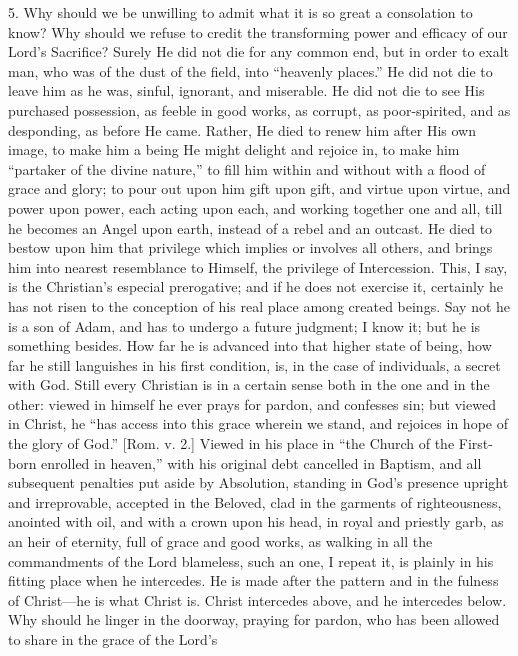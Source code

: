 5. Why should we be unwilling to admit what it is so great a
consolation to know? Why should we refuse to credit the transforming
power and efficacy of our Lord's Sacrifice? Surely He did not die
for any common end, but in order to exalt man, who was of the dust of
the field, into ``heavenly places.'' He did not die to leave
him as he was, sinful, ignorant, and miserable. He did not die to see
His purchased possession, as feeble in good works, as corrupt, as
poor-spirited, and as desponding, as before He came. Rather, He died
to renew him after His own image, to make him a being He might delight
and rejoice in, to make him ``partaker of the divine nature,''
to fill him within and without with a flood of grace and glory; to
pour out upon him gift upon gift, and virtue upon virtue, and power
upon power, each acting upon each, and working together one and all,
till he becomes an Angel upon earth, instead of a rebel and an
outcast. He died to bestow upon him that privilege which implies or
involves all others, and brings him into nearest resemblance to
Himself, the privilege of Intercession. This, I say, is the Christian's
especial prerogative; and if he does not exercise it, certainly he has
not risen to the conception of his real place among created beings.
Say not he is a son of Adam, and has to undergo a future judgment; I
know it; but he is something besides. How far he is advanced into that
higher state of being, how far he still languishes in his first
condition, is, in the case of individuals, a secret with God. Still
every Christian is in a certain sense both in the one and in the
other: viewed in himself he ever prays for pardon, and confesses sin;
but viewed in Christ, he ``has access into this grace wherein we
stand, and rejoices in hope of the glory of God.'' [Rom. v. 2.]
Viewed in his place in ``the Church of the First-born enrolled in
heaven,'' with his original debt cancelled in Baptism, and all
subsequent penalties put aside by Absolution, standing in God's presence upright and irreprovable, accepted in the Beloved, clad in
the garments of righteousness, anointed with oil, and with a crown
upon his head, in royal and priestly garb, as an heir of eternity,
full of grace and good works, as walking in all the commandments of
the Lord blameless, such an one, I repeat it, is plainly in his
fitting place when he intercedes. He is made after the pattern and in
the fulness of Christ—he is what Christ is. Christ intercedes above,
and he intercedes below. Why should he linger in the doorway, praying
for pardon, who has been allowed to share in the grace of the Lord's
